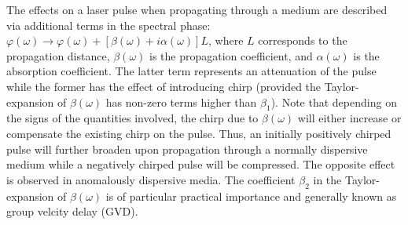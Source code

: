 \documentclass[a4paper]{jpconf}
\begin{document}
The effects on a laser pulse when propagating through a medium are described via additional terms in the spectral phase: $\varphi(\omega) \to \varphi(\omega) + [\beta(\omega) + i \alpha(\omega)]L$, where $L$ corresponds to the propagation distance, $\beta(\omega)$ is the propagation coefficient, and $\alpha(\omega)$ is the absorption coefficient. The latter term represents an attenuation of the pulse while the former has the effect of introducing chirp (provided the Taylor-expansion of $\beta(\omega)$ has non-zero terms higher than $\beta_1$). Note that depending on the signs of the quantities involved, the chirp due to $\beta(\omega)$ will either increase or compensate the existing chirp on the pulse. Thus, an initially positively chirped pulse will further broaden upon propagation through a normally dispersive medium while a negatively chirped pulse will be compressed. The opposite effect is observed in anomalously dispersive media. The coefficient $\beta_2$ in the Taylor-expansion of $\beta(\omega)$ is of particular practical importance and generally known as group velcity delay (GVD).
\end{document}
